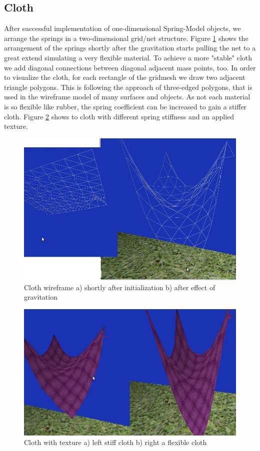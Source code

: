 \documentclass[11pt]{article}
\begin{document}
\subsection{Cloth}
After successful implementation of one-dimensional Spring-Model objects, we arrange the springs in a two-dimensional grid/net structure. Figure \ref{fig:cloth-grid} shows the arrangement of the springs shortly after the gravitation starts pulling the net to a great extend simulating a very flexible material. To achieve a more "stable" cloth we add diagonal connections between diagonal adjacent mass points, too. In order to visualize the cloth, for each rectangle of the gridmesh we draw two adjacent triangle polygons. This is following the approach of three-edged polygons, that is used in the wireframe model of many surfaces and objects. As not each material is so flexible like rubber, the spring coefficient can be increased to gain a stiffer cloth. Figure \ref{fig:cloth-stif} shows to cloth with different spring stiffness and an applied texture.

\begin{figure}[h]
\centering
\includegraphics[scale=0.3]{cloth-grid.jpg}
\caption{Cloth wireframe a) shortly after initialization b) after effect of gravitation}
\label{fig:cloth-grid}
\end{figure}

\begin{figure}[h]
\centering
\includegraphics[scale=0.3]{cloth-stiffness.jpg}
\caption{Cloth with texture a) left stiff cloth b) right a flexible cloth}
\label{fig:cloth-stif}
\end{figure}
\end{document}
